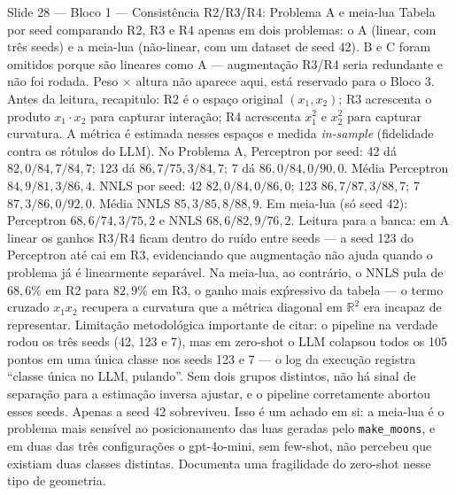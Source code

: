 \documentclass[aspectratio=169,10pt]{beamer}
\begin{document}
\begin{frame}{Slide 28 --- Bloco 1 --- Consist\^encia R2/R3/R4: Problema A e meia-lua}
\footnotesize
Tabela por seed comparando R2, R3 e R4 apenas em dois problemas: o A (linear, com tr\^es seeds) e a meia-lua (n\~ao-linear, com um dataset de seed 42). B e C foram omitidos porque s\~ao lineares como A --- augmenta\c{c}\~ao R3/R4 seria redundante e n\~ao foi rodada. Peso $\times$ altura n\~ao aparece aqui, est\'a reservado para o Bloco 3. Antes da leitura, recapitulo: R2 \'e o espa\c{c}o original $(x_1, x_2)$; R3 acrescenta o produto $x_1 \cdot x_2$ para capturar intera\c{c}\~ao; R4 acrescenta $x_1^2$ e $x_2^2$ para capturar curvatura. A m\'etrica \'e estimada nesses espa\c{c}os e medida \emph{in-sample} (fidelidade contra os r\'otulos do LLM). No Problema A, Perceptron por seed: 42 d\'a $82{,}0 / 84{,}7 / 84{,}7$; 123 d\'a $86{,}7 / 75{,}3 / 84{,}7$; 7 d\'a $86{,}0 / 84{,}0 / 90{,}0$. M\'edia Perceptron $84{,}9 / 81{,}3 / 86{,}4$. NNLS por seed: 42 $82{,}0 / 84{,}0 / 86{,}0$; 123 $86{,}7 / 87{,}3 / 88{,}7$; 7 $87{,}3 / 86{,}0 / 92{,}0$. M\'edia NNLS $85{,}3 / 85{,}8 / 88{,}9$. Em meia-lua (s\'o seed 42): Perceptron $68{,}6 / 74{,}3 / 75{,}2$ e NNLS $68{,}6 / 82{,}9 / 76{,}2$. Leitura para a banca: em A linear os ganhos R3/R4 ficam dentro do ru\'ido entre seeds --- a seed 123 do Perceptron at\'e cai em R3, evidenciando que augmenta\c{c}\~ao n\~ao ajuda quando o problema j\'a \'e linearmente separ\'avel. Na meia-lua, ao contr\'ario, o NNLS pula de $68{,}6\%$ em R2 para $82{,}9\%$ em R3, o ganho mais ex\'pressivo da tabela --- o termo cruzado $x_1 x_2$ recupera a curvatura que a m\'etrica diagonal em $\mathbb{R}^2$ era incapaz de representar. Limita\c{c}\~ao metodol\'ogica importante de citar: o pipeline na verdade rodou os tr\^es seeds (42, 123 e 7), mas em zero-shot o LLM colapsou todos os 105 pontos em uma \'unica classe nos seeds 123 e 7 --- o log da execu\c{c}\~ao registra ``classe \'unica no LLM, pulando''. Sem dois grupos distintos, n\~ao h\'a sinal de separa\c{c}\~ao para a estima\c{c}\~ao inversa ajustar, e o pipeline corretamente abortou esses seeds. Apenas a seed 42 sobreviveu. Isso \'e um achado em si: a meia-lua \'e o problema mais sens\'ivel ao posicionamento das luas geradas pelo \texttt{make\_moons}, e em duas das tr\^es configura\c{c}\~oes o gpt-4o-mini, sem few-shot, n\~ao percebeu que existiam duas classes distintas. Documenta uma fragilidade do zero-shot nesse tipo de geometria.
\end{frame}
\end{document}
